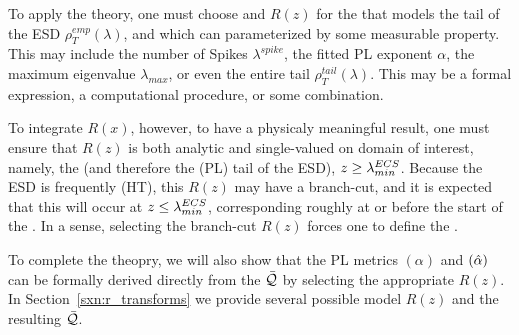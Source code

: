 To apply the theory, one must choose and \RTransform $R(z)$ for	the \Teacher that models 
the tail of the ESD $\rho^{emp}_{T}(\lambda)$, and which can
parameterized by some measurable property.
This may include the number of Spikes $\lambda^{spike}$, the fitted PL exponent $\alpha$,
the maximum eigenvalue $\lambda_{max}$, or even the entire tail $\rho^{tail}_{T}(\lambda)$.
This may be a formal expression, a computational procedure, or some combination.

To integrate $R(x)$, however, to have a physicaly meaningful result,
one must ensure that $R(z)$ is both
analytic and single-valued on domain of interest, namely, the \ECS (and therefore
the (PL) tail of the ESD),  $z \ge \lambda^{ECS}_{min}$.
Because the ESD is frequently \HeavyTailed (HT), this
\RTransform $R(z)$ may have a branch-cut, and it is expected that this will occur
at $z\le \lambda^{ECS}_{min}$, corresponding roughly at or before the start of the \ECS.
In a sense, selecting the branch-cut $R(z)$ forces one to define the \ECS.

To complete the theopry, we
will also show that the \HTSR PL \LayerQuality metrics \ALPHA $(\alpha)$  and \ALPHAHAT $(\hat\alpha)$
can be formally derived directly from the \SETOL \LayerQuality $\bar{\mathcal{Q}}$ by selecting the appropriate
\RTransform $R(z)$. In Section~\ref{sxn:r_transforms} we provide several possible
model $R(z)$ and the resulting \LayerQuality $\bar{\mathcal{Q}}$.

